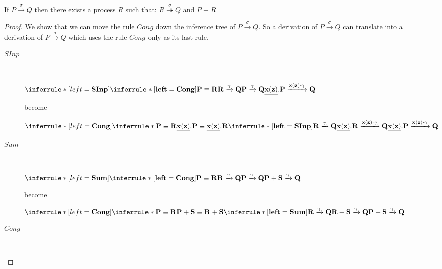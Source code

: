 \begin{proposition}\label{moveCongDown}
  If $P\xrightarrow{\sigma} Q$ then there exists a process $R$ such that: $R\stackrel{\sigma}{\twoheadrightarrow}Q$ and $P\equiv R$
  \begin{proof}
    We show that we can move the rule $Cong$ down the inference tree of $P\xrightarrow{\sigma} Q$. So a derivation of $P\xrightarrow{\sigma} Q$ can translate into a derivation of $P\xrightarrow{\sigma} Q$ which uses the rule $Cong$ only as its last rule.
    \begin{description}
      \item[$SInp$]\hfill \\
	\begin{center}
	  $\inferrule* [left=\bf{SInp}]{
	    \inferrule* [left=\bf{Cong}]{
		P \equiv R
	      \\
		R \xrightarrow{\gamma} Q
	    }{
	      P \xrightarrow{\gamma} Q
	    }
	  }{
	    \underline{x(z)}.P \xrightarrow{x(z) \cdot \gamma} Q
	  }$
	\end{center}
	become
	\begin{center}
	  $\inferrule* [left=\bf{Cong}]{
	    \inferrule* {
	      P \equiv R
	    }{
	      \underline{x(z)}.P \equiv \underline{x(z)}.R
	    }
	  \\
	    \inferrule* [left=\bf{SInp}]{
	      R \xrightarrow{\gamma} Q
	    }{
	      \underline{x(z)}.R \xrightarrow{x(z) \cdot \gamma} Q
	    }
	  }{
	    \underline{x(z)}.P \xrightarrow{x(z) \cdot \gamma} Q
	  }$
	\end{center}
      \item[$Sum$]\hfill \\
	\begin{center}
	  $\inferrule* [left=\bf{Sum}]{
	    \inferrule* [left=\bf{Cong}]{
		P \equiv R
	      \\
		R \xrightarrow{\gamma} Q
	    }{
	      P \xrightarrow{\gamma} Q
	    }
	  }{
	    P+S \xrightarrow{\gamma} Q
	  }$
	\end{center}
	become
	\begin{center}
	  $\inferrule* [left=\bf{Cong}]{
	    \inferrule* {
	      P \equiv R
	    }{
	      P+S \equiv R+S
	    }
	  \\
	    \inferrule* [left=\bf{Sum}]{
	      R \xrightarrow{\gamma} Q
	    }{
	      R+S \xrightarrow{\gamma} Q
	    }
	  }{
	    P+S \xrightarrow{\gamma} Q
	  }$
	\end{center}
      \item[$Cong$]\hfill \\

\end{description}
\end{proof}
\end{proposition}
